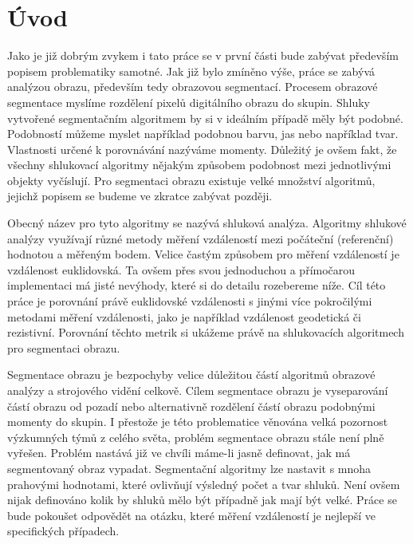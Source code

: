 \documentclass[czech, master, public, dept460, male, cpdeclaration, oneside]{diploma}
\begin{document}
	
\MakeTitlePages
\lstlistoflistings

\section*{Úvod}
Jako je již dobrým zvykem i tato práce se v první části bude zabývat především popisem problematiky samotné. Jak již bylo zmíněno výše, práce se zabývá analýzou obrazu, především tedy obrazovou segmentací. Procesem obrazové segmentace myslíme rozdělení pixelů digitálního obrazu do skupin. Shluky vytvořené segmentačním algoritmem by si v ideálním případě měly být podobné. Podobností můžeme myslet například podobnou barvu, jas nebo například tvar. Vlastnosti určené k porovnávání nazýváme momenty. Důležitý je ovšem fakt, že všechny shlukovací algoritmy nějakým způsobem podobnost mezi jednotlivými objekty vyčíslují. Pro segmentaci obrazu existuje velké množství algoritmů, jejichž popisem se budeme ve zkratce zabývat později.\par
Obecný název pro tyto algoritmy se nazývá shluková analýza. Algoritmy shlukové analýzy využívají různé metody měření vzdáleností mezi počáteční (referenční) hodnotou a měřeným bodem. Velice častým způsobem pro měření vzdáleností je vzdálenost euklidovská. Ta ovšem přes svou jednoduchou a přímočarou implementaci má jisté nevýhody, které si do detailu rozebereme níže. Cíl této práce je porovnání právě euklidovské vzdálenosti s jinými více pokročilými metodami měření vzdálenosti, jako je například vzdálenost geodetická či rezistivní. Porovnání těchto metrik si ukážeme právě na shlukovacích algoritmech pro segmentaci obrazu.\par
Segmentace obrazu je bezpochyby velice důležitou částí algoritmů obrazové analýzy a strojového vidění celkově. Cílem segmentace obrazu je vyseparování částí obrazu od pozadí nebo alternativně rozdělení částí obrazu podobnými momenty do skupin. I přestože je této problematice věnována velká pozornost výzkumných týmů z celého světa, problém segmentace obrazu stále není plně vyřešen. Problém nastává již ve chvíli máme-li jasně definovat, jak má segmentovaný obraz vypadat. Segmentační algoritmy lze nastavit s mnoha prahovými hodnotami, které ovlivňují výsledný počet a tvar shluků. Není ovšem nijak definováno kolik by shluků mělo být případně jak mají být velké. Práce se bude pokoušet odpovědět na otázku, které měření vzdáleností je nejlepší ve specifických případech.
\end{document}
